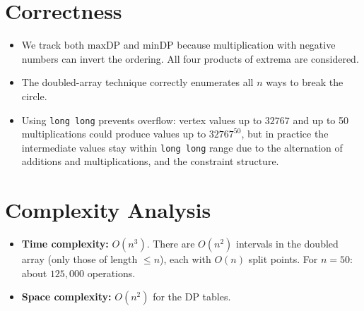 \documentclass[11pt,a4paper]{article}
\begin{document}
\section{Correctness}

\begin{itemize}
  \item We track both $\mathrm{maxDP}$ and $\mathrm{minDP}$ because multiplication with negative
        numbers can invert the ordering. All four products of extrema are considered.
  \item The doubled-array technique correctly enumerates all $n$ ways to break the circle.
  \item Using \texttt{long long} prevents overflow: vertex values up to $32767$ and
        up to 50 multiplications could produce values up to $32767^{50}$, but in practice
        the intermediate values stay within \texttt{long long} range due to the alternation
        of additions and multiplications, and the constraint structure.
\end{itemize}

\section{Complexity Analysis}

\begin{itemize}
  \item \textbf{Time complexity:} $O(n^3)$. There are $O(n^2)$ intervals in the doubled
        array (only those of length $\le n$), each with $O(n)$ split points.
        For $n = 50$: about $125{,}000$ operations.
  \item \textbf{Space complexity:} $O(n^2)$ for the DP tables.
\end{itemize}
\end{document}

